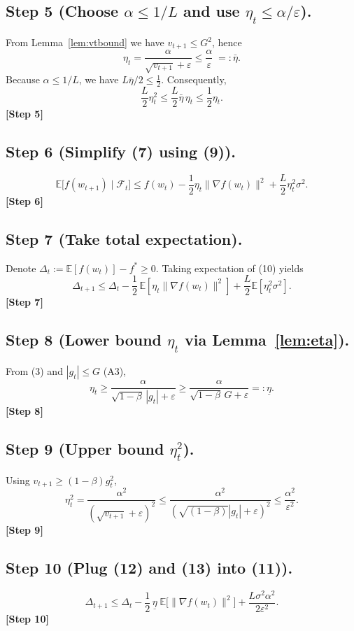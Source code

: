 \documentclass[11pt]{article}
\newcommand{\E}{\mathbb{E}}
\begin{document}
\subsection*{Step 5 (Choose $\alpha\le 1/L$ and use $\eta_t\le\alpha/\varepsilon$).}
From Lemma~\ref{lem:vtbound} we have $v_{t+1}\le G^{2}$, hence
\[
\eta_t = \frac{\alpha}{\sqrt{v_{t+1}}+\varepsilon}
\le \frac{\alpha}{\varepsilon}\;=: \bar\eta . \tag{8}
\]
Because $\alpha\le1/L$, we have $L\bar\eta/2\le \frac12$.  Consequently,
\[
\frac{L}{2}\eta_t^{2}\le\frac{L}{2}\bar\eta\,\eta_t\le\frac12\eta_t. \tag{9}
\]
\noindent\textbf{[Step 5]}

\subsection*{Step 6 (Simplify (7) using (9)).}
\[
\E\big[f(w_{t+1})\mid\mathcal{F}_t\big]
\le f(w_t)-\frac12\eta_t\|\nabla f(w_t)\|^{2}
+\frac{L}{2}\eta_t^{2}\sigma^{2}. \tag{10}
\]
\noindent\textbf{[Step 6]}

\subsection*{Step 7 (Take total expectation).}
Denote $\Delta_t:=\E[f(w_t)]-f^{*}\ge0$.  Taking expectation of (10) yields
\[
\Delta_{t+1}
\le \Delta_{t}
-\frac12\,\E[\eta_t\|\nabla f(w_t)\|^{2}]
+\frac{L}{2}\E[\eta_t^{2}\sigma^{2}]. \tag{11}
\]
\noindent\textbf{[Step 7]}

\subsection*{Step 8 (Lower bound $\eta_t$ via Lemma~\ref{lem:eta}).}
From (3) and $|g_t|\le G$ (A3),
\[
\eta_t\ge\frac{\alpha}{\sqrt{1-\beta}\,|g_t|+\varepsilon}
\ge\frac{\alpha}{\sqrt{1-\beta}\,G+\varepsilon}
=: \underline\eta . \tag{12}
\]
\noindent\textbf{[Step 8]}

\subsection*{Step 9 (Upper bound $\eta_t^{2}$).}
Using $v_{t+1}\ge (1-\beta)g_t^{2}$,
\[
\eta_t^{2}
= \frac{\alpha^{2}}{(\sqrt{v_{t+1}}+\varepsilon)^{2}}
\le \frac{\alpha^{2}}{( \sqrt{(1-\beta)}|g_t|+\varepsilon)^{2}}
\le \frac{\alpha^{2}}{\varepsilon^{2}}. \tag{13}
\]
\noindent\textbf{[Step 9]}

\subsection*{Step 10 (Plug (12) and (13) into (11)).}
\[
\Delta_{t+1}
\le \Delta_{t}
-\frac12\,\underline\eta\;\E\!\big[\|\nabla f(w_t)\|^{2}\big]
+\frac{L\sigma^{2}\alpha^{2}}{2\varepsilon^{2}}. \tag{14}
\]
\noindent\textbf{[Step 10]}
\end{document}
